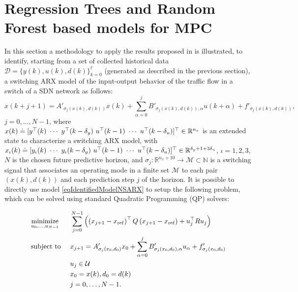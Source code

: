 \section{Regression Trees and Random Forest based models for MPC}\label{secSwitchedModeling}
In this section a methodology to apply the results proposed in \cite{SmarraADHS2018,smarraNAHS2020} is illustrated, to identify, starting from a set of collected historical data $ \mathcal{D}=\{y(k),u(k),d(k)\}_{k = 0}^{\ell} $ (generated as described in the previous section), a switching ARX model of the input-output behavior of the traffic flow in a switch of a SDN network as follows:
\begin{equation}\label{eqIdentifiedModelNSARX}
x(k+j+1) =	A'_{\sigma_j(x(k),d(k))} x(k) + \sum_{\alpha = 0}^{j}B'_{\sigma_{j}(x(k),d(k)),\alpha} u(k+\alpha) + f'_{\sigma_j(x(k),d(k))},
\end{equation}
\noindent $j = 0,\ldots, N-1$, where $x(k) \doteq [y^\top(k)\ \cdots\ y^\top(k-\delta_y)\ u^\top(k-1)\ \cdots\ u^\top(k-\delta_u)]^\top\in\Real^{n_x}$ is an extended state to characterize a switching ARX model, with $x_\iota(k) \doteq [y_\iota(k)\ \cdots\ y_\iota(k-\delta_y)\ u^\top(k-1)\ \cdots\ u^\top(k-\delta_u)]^\top\in\Real^{\delta_y+1+3\delta_u}$, $\iota = 1,2,3$, $N$ is the chosen future predictive horizon, and  $\sigma_j : \mathbb{R}^{n_x+10} \to \mathcal M \subset \mathbb{N}$ is a switching signal that associates an operating mode in a finite set $\mathcal M$ to each pair $(x(k),d(k))$ and each prediction step $j$ of the horizon.
It is possible to directly use model \eqref{eqIdentifiedModelNSARX} to setup the following problem, which can be solved using standard Quadratic Programming (QP) solvers:\\
\begin{problem}\label{pbMPCSwitching}
	\vspace{-0.3cm}
	\begin{equation*}
		\begin{aligned}
			& \underset{u_0,\ldots,u_{N-1}}{\text{minimize}} & &  \sum_{j=0}^{N-1} \left(\left(x_{j+1}-x_{\mathrm{ref}}\right)^\top Q \left(x_{j+1}-x_{\mathrm{ref}}\right) + u^\top_{j} R u_{j}\right)\\
			& \text{subject to }            & &  x_{j+1} = A'_{\sigma_j(x_{0},d_{0})} x_0 + \sum_{\alpha = 0}^{j}B'_{\sigma_{j}(x_{0},d_{0}),\alpha} u_\alpha + f'_{\sigma_j(x_{0},d_{0})}\\       
			&                               & &  u_{j}   \in \mathcal{U}\\
			&                               & &  x_{0} = x(k), d_{0} = d(k)\\ 
			&                               & &  j = 0,\ldots,N-1.			\\
		\end{aligned}
		\vspace{0.1cm}
	\end{equation*}
\end{problem}
